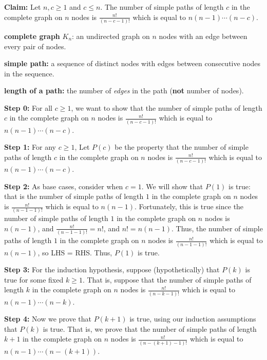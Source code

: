 \documentclass{article}
\begin{document}
\textbf{Claim:} Let $n,c\geq 1$ and $c\leq n$. The number of simple paths of length $c$ in the complete graph on $n$ nodes is $\frac{n!}{(n-c-1)!}$ which is equal to $n(n-1)\cdots (n-c)$.

\vspace{10pt}

\textbf{complete graph} $K_n$: an undirected graph on $n$ nodes with an edge between every pair of nodes.
\vspace{5pt}

\textbf{simple path:} a sequence of distinct nodes with edges between consecutive nodes in the sequence.
\vspace{5pt}

\textbf{length of a path:} the number of \textit{edges} in the path (\textbf{not} number of nodes).
\vspace{5pt}


\textbf{Step 0:} For all $c\geq 1$, we want to show that the number of simple paths of length $c$ in the complete graph on $n$ nodes is $\frac{n!}{(n-c-1)!}$ which is equal to $n(n-1)\cdots (n-c)$.
\vspace{15pt}

\textbf{Step 1:} For any $c\geq 1$, Let $P(c)$ be the property that the number of simple paths of length $c$ in the complete graph on $n$ nodes is $\frac{n!}{(n-c-1)!}$ which is equal to $n(n-1)\cdots (n-c)$.
\vspace{15pt}

\textbf{Step 2:} As base cases, consider when $c=1$. We will show that $P(1)$ is true: that is the number of simple paths of length $1$ in the complete graph on $n$ nodes is $\frac{n!}{(n-1-1)!}$ which is equal to $n(n-1)$. Fortunately, this is true since the number of simple paths of length $1$ in the complete graph on $n$ nodes is $n(n-1)$, and $\frac{n!}{(n-1-1)!}=n!$, and $n!=n(n-1)$. Thus, the number of simple paths of length $1$ in the complete graph on $n$ nodes is $\frac{n!}{(n-1-1)!}$ which is equal to $n(n-1)$, so LHS = RHS. Thus, $P(1)$ is true.
\vspace{15pt}


\textbf{Step 3:} For the induction hypothesis, suppose (hypothetically) that $P(k)$ is true for some fixed $k\geq 1$. That is, suppose that the number of simple paths of length $k$ in the complete graph on $n$ nodes is $\frac{n!}{(n-k-1)!}$ which is equal to $n(n-1)\cdots (n-k)$.\vspace{15pt}

\textbf{Step 4:} Now we prove that $P(k+1)$ is true, using our induction assumptions that $P(k)$ is true. That is, we prove that the number of simple paths of length $k+1$ in the complete graph on $n$ nodes is $\frac{n!}{(n-(k+1)-1)!}$ which is equal to $n(n-1)\cdots (n-(k+1))$.\vspace{15pt}
\end{document}
